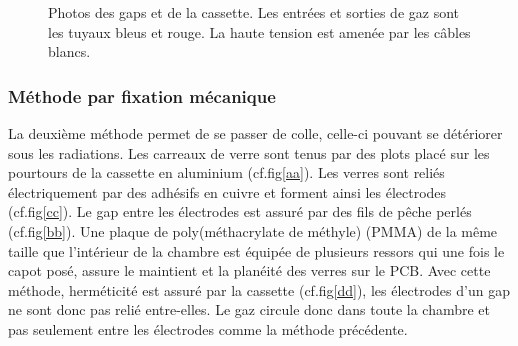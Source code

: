\begin{figure}[ht!]
\begin{minipage}[t]{.45\textwidth}
    \end{minipage}
 	\caption{Photos des gaps et de la cassette. Les entrées et sorties de gaz sont les tuyaux bleus et rouge. La haute tension est amenée par les câbles blancs.}
 	\label{colle}
 \end{figure}
 
 \subsubsection{Méthode par fixation mécanique}
 La deuxième méthode permet de se passer de colle, celle-ci pouvant se détériorer sous les radiations. Les carreaux de verre sont tenus par des plots placé sur les pourtours de la cassette en aluminium (cf.fig\ref{aa}). Les verres sont reliés électriquement par des adhésifs en cuivre et forment ainsi les électrodes (cf.fig\ref{cc}). Le gap entre les électrodes est assuré par des fils de pêche perlés (cf.fig\ref{bb}). Une plaque de poly(méthacrylate de méthyle) (PMMA) de la même taille que l'intérieur de la chambre est équipée de plusieurs ressors qui une fois le capot posé, assure le maintient et la planéité des verres sur le PCB.  Avec cette méthode, herméticité est assuré par la cassette (cf.fig\ref{dd}), les électrodes d'un gap ne sont donc pas relié entre-elles. Le gaz circule donc dans toute la chambre et pas seulement entre les électrodes comme la méthode précédente.
 
